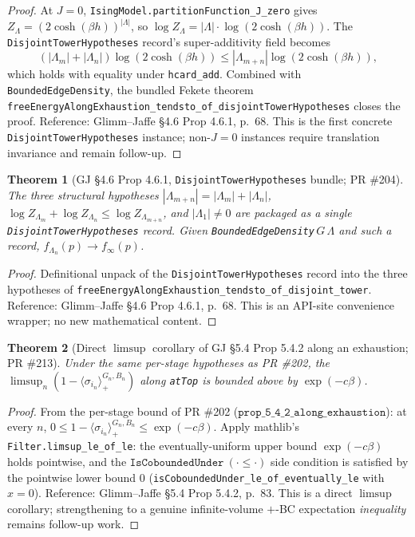 \documentclass[a4paper,11pt]{article}
\newtheorem{theorem}{Theorem}
\begin{document}
\begin{proof}
At $J = 0$, \texttt{IsingModel.partitionFunction\_J\_zero} gives
$Z_\Lambda = (2\cosh(\beta h))^{|\Lambda|}$, so
$\log Z_\Lambda = |\Lambda| \cdot \log(2\cosh(\beta h))$. The
\texttt{DisjointTowerHypotheses} record's super-additivity field
becomes
\[
  (|\Lambda_m| + |\Lambda_n|) \log(2\cosh(\beta h))
  \le |\Lambda_{m+n}| \log(2\cosh(\beta h)),
\]
which holds with equality under \texttt{hcard\_add}. Combined with
\texttt{BoundedEdgeDensity}, the bundled Fekete theorem
\texttt{freeEnergyAlongExhaustion\_tendsto\_of\_disjointTowerHypotheses}
closes the proof.  Reference: Glimm--Jaffe \cite{glimm-jaffe} \S 4.6
Prop 4.6.1, p.~68. This is the first concrete
\texttt{DisjointTowerHypotheses} instance; non-$J\!=\!0$ instances
require translation invariance and remain follow-up.
\end{proof}

\begin{theorem}[GJ \S 4.6 Prop 4.6.1,
\texttt{DisjointTowerHypotheses} bundle; PR \#204]
The three structural hypotheses $|\Lambda_{m+n}| = |\Lambda_m|
+ |\Lambda_n|$, $\log Z_{\Lambda_m} + \log Z_{\Lambda_n} \le
\log Z_{\Lambda_{m+n}}$, and $|\Lambda_1| \neq 0$ are packaged
as a single \texttt{DisjointTowerHypotheses} record. Given
\texttt{BoundedEdgeDensity}$\,G\,\Lambda$ and such a record,
$f_{\Lambda_n}(p) \to f_\infty(p)$.
\end{theorem}

\begin{proof}
Definitional unpack of the
\texttt{DisjointTowerHypotheses} record into the three
hypotheses of
\texttt{freeEnergyAlongExhaustion\_tendsto\_of\_disjoint\_tower}.
Reference: Glimm--Jaffe \cite{glimm-jaffe} \S 4.6 Prop 4.6.1,
p.~68. This is an API-site convenience wrapper; no new
mathematical content.
\end{proof}

\begin{theorem}[Direct $\limsup$ corollary of GJ \S 5.4 Prop 5.4.2
along an exhaustion; PR \#213]
Under the same per-stage hypotheses as PR \#202, the
$\limsup_n (1 - \langle \sigma_{i_n} \rangle_{+}^{G_n, B_n})$ along
\texttt{atTop} is bounded above by $\exp(-c\beta)$.
\end{theorem}

\begin{proof}
From the per-stage bound of PR \#202
($\texttt{prop\_5\_4\_2\_along\_exhaustion}$): at every $n$,
$0 \le 1 - \langle \sigma_{i_n} \rangle_{+}^{G_n, B_n} \le
\exp(-c\beta)$. Apply mathlib's
\texttt{Filter.limsup\_le\_of\_le}: the eventually-uniform upper
bound $\exp(-c\beta)$ holds pointwise, and the
\(\texttt{IsCoboundedUnder}~(\cdot \le \cdot)\) side condition is
satisfied by the pointwise lower bound $0$
(\texttt{isCoboundedUnder\_le\_of\_eventually\_le} with $x = 0$).
Reference: Glimm--Jaffe \cite{glimm-jaffe} \S 5.4 Prop 5.4.2,
p.~83. This is a direct $\limsup$ corollary; strengthening to a
genuine infinite-volume $+$-BC expectation \emph{inequality}
remains follow-up work.
\end{proof}
\end{document}
